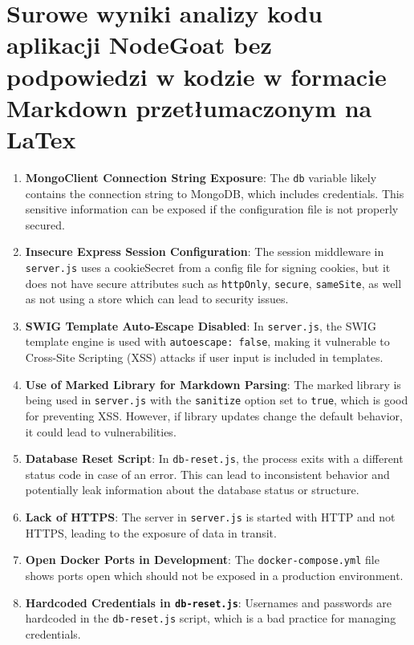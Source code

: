 \chapter{Surowe wyniki analizy kodu aplikacji NodeGoat bez podpowiedzi w kodzie w formacie Markdown przetłumaczonym na LaTex}\label{app1}

\normalsize
\begin{enumerate}
  \def\labelenumi{\arabic{enumi}.}
  \item
    \textbf{MongoClient Connection String Exposure}: The \texttt{db}
    variable likely contains the connection string to MongoDB, which
    includes credentials. This sensitive information can be exposed if the
    configuration file is not properly secured.
  \item
    \textbf{Insecure Express Session Configuration}: The session
    middleware in \texttt{server.js} uses a cookieSecret from a config
    file for signing cookies, but it does not have secure attributes such
    as \texttt{httpOnly}, \texttt{secure}, \texttt{sameSite}, as well as
    not using a store which can lead to security issues.
  \item
    \textbf{SWIG Template Auto-Escape Disabled}: In \texttt{server.js},
    the SWIG template engine is used with \texttt{autoescape:\ false},
    making it vulnerable to Cross-Site Scripting (XSS) attacks if user
    input is included in templates.
  \item
    \textbf{Use of Marked Library for Markdown Parsing}: The marked
    library is being used in \texttt{server.js} with the \texttt{sanitize}
    option set to \texttt{true}, which is good for preventing XSS.
    However, if library updates change the default behavior, it could lead
    to vulnerabilities.
  \item
    \textbf{Database Reset Script}: In \texttt{db-reset.js}, the process
    exits with a different status code in case of an error. This can lead
    to inconsistent behavior and potentially leak information about the
    database status or structure.
  \item
    \textbf{Lack of HTTPS}: The server in \texttt{server.js} is started
    with HTTP and not HTTPS, leading to the exposure of data in transit.
  \item
    \textbf{Open Docker Ports in Development}: The
    \texttt{docker-compose.yml} file shows ports open which should not be
    exposed in a production environment.
  \item
    \textbf{Hardcoded Credentials in \texttt{db-reset.js}}: Usernames and
    passwords are hardcoded in the \texttt{db-reset.js} script, which is a
    bad practice for managing credentials.
  \end{enumerate}
  

